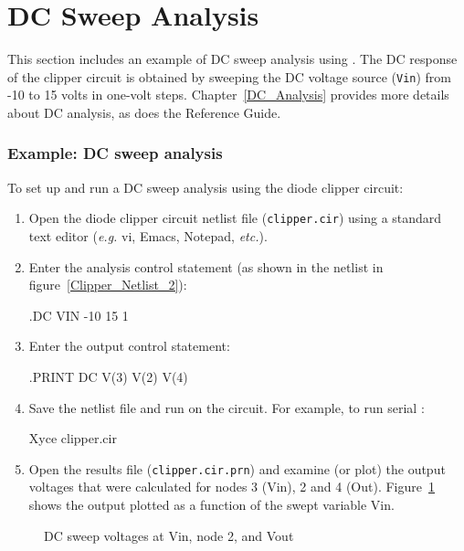 \section{DC Sweep Analysis}
\label{DC_Sweep}
This section includes an example of DC sweep
 analysis using \Xyce{}.  
The DC response of the clipper circuit is obtained by sweeping the DC voltage 
source (\texttt{Vin}) from -10 to 15 volts in one-volt steps.
Chapter~\ref{DC_Analysis} provides more details about DC analysis,  
as does the \Xyce{} Reference 
Guide\ReferenceGuide{}.

\subsubsection{Example: DC sweep analysis}
To set up and run a DC sweep analysis using the diode clipper circuit:
\begin{enumerate}
\item Open the diode clipper circuit netlist file (\texttt{clipper.cir}) 
using a standard text editor (\emph{e.g.\/} vi, Emacs, Notepad, \emph{etc.\/}).
\item Enter the analysis control statement (as shown in the netlist in figure~\ref{Clipper_Netlist_2}):
\begin{vquote}
.DC VIN -10 15 1
\end{vquote}
\item Enter the output control statement:
\begin{vquote}
.PRINT DC V(3) V(2) V(4)
\end{vquote}
\item Save the netlist file and run \Xyce{} on the circuit. For example, to run
  serial \Xyce{}:
\begin{vquote}
 Xyce clipper.cir
\end{vquote}
\item Open the results file (\texttt{clipper.cir.prn}) and examine (or plot) the 
  output voltages that were calculated for nodes 3 (Vin), 2 and 4 (Out).
  Figure~\ref{Clipper_DCSweep} shows the output plotted as a function of the
  swept variable Vin.
\end{enumerate}

\begin{figure}[H]
\begin{centering}
\caption{DC sweep voltages at Vin, node 2, and Vout\label{Clipper_DCSweep}}
\end{centering}
\end{figure}

